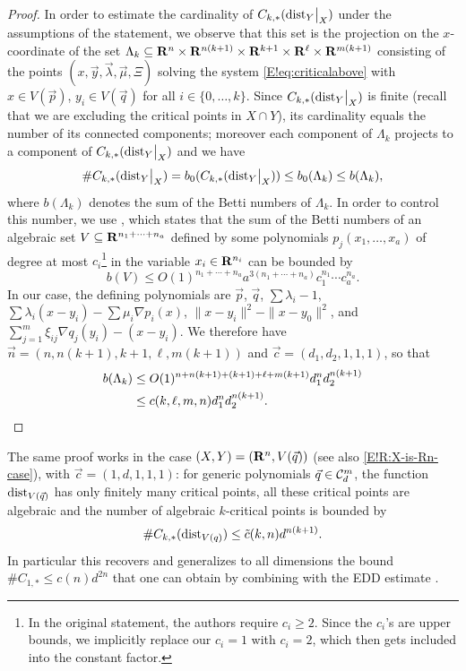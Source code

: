 \begin{proof}
  In order to estimate the cardinality of $C_{k, *}(\mathord{\operatorname{dist}}_Y\big|_X)$ under the assumptions of the statement, we observe that  this set is the projection on the $x$-coordinate of the set $\Lambda_k \subseteq \mathbf{R}^n \times \mathbf{R}^{n(k+1)} \times \mathbf{R}^{k + 1} \times \mathbf{R}^\ell \times \mathbf{R}^{m(k + 1)}$ consisting of the points $(x, \vec{y}, \vec{\lambda}, \vec{\mu}, \Xi)$ solving the system \eqref{E!eq:criticalabove} with $x\in V(\vec{p})$, $y_i\in V(\vec{q})$ for all $i\in \{0, \ldots, k\}$. Since $C_{k, *}(\mathord{\operatorname{dist}}_Y\big|_X)$ is finite (recall that we are excluding the critical points in $X \cap Y$), its cardinality equals the number of its connected components; moreover each component of $\Lambda_k$ projects to a component of $C_{k, *}(\mathord{\operatorname{dist}}_Y\big|_X)$ and we have
  \[
    \#C_{k, *}(\mathord{\operatorname{dist}}_Y\big|_X) = b_0(C_{k, *}(\mathord{\operatorname{dist}}_Y\big|_X)) \leq b_0(\Lambda_k) \leq b(\Lambda_k),
  \]
  where $b(\Lambda_k)$ denotes the sum of the Betti numbers of $\Lambda_k$. In order to control this number, we use \cite[Theorem 2.6]{basu2018multi}, which states that the sum of the Betti numbers of an algebraic set $V \subseteq \mathbf{R}^{n_1 + \cdots + n_a}$ defined by some polynomials $p_j(x_1, \ldots, x_a)$ of degree at most $c_i$\footnote{In the original statement, the authors require $c_i \geq 2$. Since the $c_i$'s are upper bounds, we implicitly replace our $c_i = 1$ with $c_i = 2$, which then gets included into the constant factor.} in the variable $x_i \in \mathbf{R}^{n_i}$ can be bounded by 
  \[
    b(V) \leq O(1)^{n_1+\cdots+n_a} a^{3(n_1+\cdots+n_a)} c_1^{n_1}\cdots c_a^{n_a}.
  \]
  In our case, the defining polynomials are $\vec{p}$, $\vec{q}$, $\sum \lambda_i - 1$, $\sum \lambda_i (x - y_i) - \sum \mu_i \nabla p_i(x)$, $\| x - y_i \|^2 - \| x - y_0 \|^2$, and $\sum_{j = 1}^m \xi_{ij} \nabla q_j(y_i) - (x - y_i)$. We therefore have $\vec{n} = (n, n(k + 1), k + 1, \ell, m(k + 1))$ and $\vec{c} = (d_1, d_2, 1, 1, 1)$, so that
  \begin{align*}
    b(\Lambda_k) & \leq O(1)^{n + n (k + 1) + (k + 1) + \ell + m(k + 1)} d_1^n d_2^{n(k + 1)} \\
    & \leq c(k, \ell, m, n) d_1^n d_2^{n(k + 1)}.
    \qedhere
  \end{align*}
\end{proof}

\begin{remark}
\label{E!R:bottleneck-bounds}
  The same proof works in the case $(X, Y) = (\mathbf{R}^n, V(\vec{q}))$ (see also \cref{E!R:X-is-Rn-case}), with $\vec{c} = (1, d, 1, 1, 1)$: for generic polynomials $\vec{q} \in \mathcal{C}_{d}^m$, the function $\operatorname{dist}_{V(\vec{q})}$ has only finitely many critical points, all these critical points are algebraic and the number of algebraic $k$-critical points is bounded by
  \[
    \#C_{k, *}(\operatorname{dist}_{V(q)}) \leq \tilde{c}(k, n) d^{n (k + 1)}.
  \]
  In particular this recovers and generalizes to all dimensions the bound $\#C_{1, *} \leq c(n) d^{2n}$ that one can obtain by combining \cite[Corollary 4.5]{Eklund2023} with the EDD estimate \cite[Corollary 2.10]{DHOST2016}.
\end{remark}

